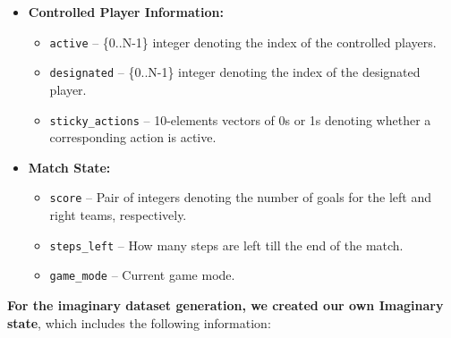 \begin{itemize}[leftmargin=*]
\item \textbf{Controlled Player Information:}
\begin{itemize}
\item \texttt{active} -- \{0..N-1\} integer denoting the index of the controlled players.
\item \texttt{designated} -- \{0..N-1\} integer denoting the index of the designated player.
\item \texttt{sticky\_actions} -- 10-elements vectors of 0s or 1s denoting whether a corresponding action is active.
\end{itemize}

\item \textbf{Match State:}
\begin{itemize}
\item \texttt{score} -- Pair of integers denoting the number of goals for the left and right teams, respectively.
\item \texttt{steps\_left} -- How many steps are left till the end of the match.
\item \texttt{game\_mode} -- Current game mode.
\end{itemize}
\end{itemize}

\textbf{For the imaginary dataset generation, we created our own Imaginary state}, which includes the following information:

